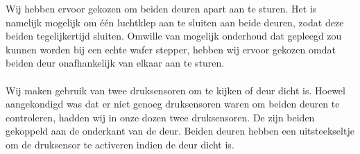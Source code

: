 Wij hebben ervoor gekozen om beiden deuren apart aan te sturen. Het is namelijk mogelijk om \'e\'en luchtklep aan te sluiten aan beide deuren, zodat deze beiden tegelijkertijd sluiten. Omwille van mogelijk onderhoud dat gepleegd zou kunnen worden bij een echte wafer stepper, hebben wij ervoor gekozen omdat beiden deur onafhankelijk van elkaar aan te sturen. \\ \\

Wij maken gebruik van twee druksensoren om te kijken of deur dicht is. Hoewel aangekondigd was dat er niet genoeg druksensoren waren om beiden deuren te controleren, hadden wij in onze dozen twee druksensoren. De zijn beiden gekoppeld aan de onderkant van de deur. Beiden deuren hebben een uitsteekseltje om de druksensor te activeren indien de deur dicht is. \\ \\

 










%
%
%

%